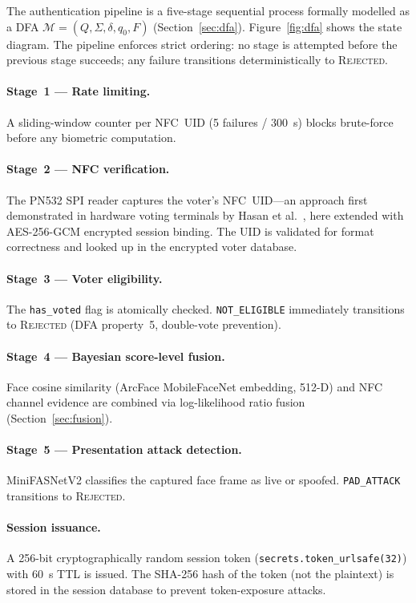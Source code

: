 \documentclass[pdflatex,sn-mathphys-num]{sn-jnl}%
\theoremstyle{thmstyleone}%
\theoremstyle{thmstyletwo}%
\theoremstyle{thmstylethree}%
\begin{document}
The authentication pipeline is a five-stage sequential process formally modelled
as a DFA $\mathcal{M} = (Q, \Sigma, \delta, q_0, F)$
(Section~\ref{sec:dfa}). Figure~\ref{fig:dfa} shows the state diagram. The
pipeline enforces strict ordering: no stage is attempted before the previous
stage succeeds; any failure transitions deterministically to \textsc{Rejected}.

\paragraph{Stage~1 --- Rate limiting.} A sliding-window counter per NFC~UID
(5 failures / 300~s) blocks brute-force before any biometric computation.

\paragraph{Stage~2 --- NFC verification.} The PN532 SPI reader captures the
voter's NFC~UID—an approach first demonstrated in hardware voting terminals by
Hasan et al.~\cite{hasan2019nfc}, here extended with AES-256-GCM encrypted
session binding. The UID is validated for format correctness and looked up in
the encrypted voter database.

\paragraph{Stage~3 --- Voter eligibility.} The \texttt{has\_voted} flag is
atomically checked. \texttt{NOT\_ELIGIBLE} immediately transitions to
\textsc{Rejected} (DFA property~5, double-vote prevention).

\paragraph{Stage~4 --- Bayesian score-level fusion.} Face cosine similarity
(ArcFace MobileFaceNet embedding, 512-D) and NFC channel evidence are combined
via log-likelihood ratio fusion (Section~\ref{sec:fusion}).

\paragraph{Stage~5 --- Presentation attack detection.} MiniFASNetV2 classifies
the captured face frame as live or spoofed. \texttt{PAD\_ATTACK} transitions to
\textsc{Rejected}.

\paragraph{Session issuance.} A 256-bit cryptographically random session token
(\texttt{secrets.token\_urlsafe(32)}) with 60~s TTL is issued. The SHA-256 hash
of the token (not the plaintext) is stored in the session database to prevent
token-exposure attacks.
\end{document}
